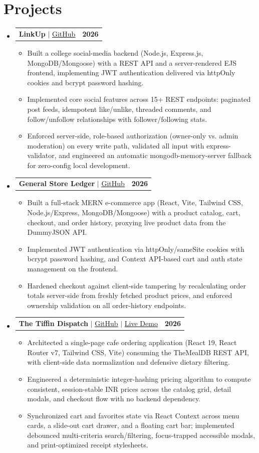 \documentclass[letterpaper,10pt]{article}
\makeatletter
\newcommand{\resumeItem}[1]{
  \item\small{
    {#1 \vspace{-2pt}}
  }
}
\newcommand{\resumeProjectHeading}[2]{
    \item
    \begin{tabular*}{1.001\textwidth}{l@{\extracolsep{\fill}}r}
      \small#1 & \textbf{\small #2}\\
    \end{tabular*}\vspace{-7pt}
}
\newcommand{\resumeSubHeadingListStart}{\begin{itemize}[leftmargin=0.0in, label={}]}
\newcommand{\resumeSubHeadingListEnd}{\end{itemize}}
\newcommand{\resumeItemListStart}{\begin{itemize}}
\newcommand{\resumeItemListEnd}{\end{itemize}\vspace{-5pt}}
\makeatother
\begin{document}
\section{Projects}
    \vspace{-5pt}
    \resumeSubHeadingListStart
\resumeProjectHeading
    {\textbf{LinkUp} $|$ \href{https://github.com/vaibhv19/LinkUp}{\underline{GitHub}}}{2026}
    \resumeItemListStart
        \resumeItem{Built a college social-media backend (Node.js, Express.js, MongoDB/Mongoose) with a REST API and a server-rendered EJS frontend, implementing JWT authentication delivered via httpOnly cookies and bcrypt password hashing.}
        \resumeItem{Implemented core social features across 15+ REST endpoints: paginated post feeds, idempotent like/unlike, threaded comments, and follow/unfollow relationships with follower/following stats.}
        \resumeItem{Enforced server-side, role-based authorization (owner-only vs. admin moderation) on every write path, validated all input with express-validator, and engineered an automatic mongodb-memory-server fallback for zero-config local development.}
    \resumeItemListEnd
          \vspace{-13pt}
\resumeProjectHeading
    {\textbf{General Store Ledger} $|$ \href{https://github.com/vaibhv19/general-store-ledger}{\underline{GitHub}}}{2026}
    \resumeItemListStart
        \resumeItem{Built a full-stack MERN e-commerce app (React, Vite, Tailwind CSS, Node.js/Express, MongoDB/Mongoose) with a product catalog, cart, checkout, and order history, proxying live product data from the DummyJSON API.}
        \resumeItem{Implemented JWT authentication via httpOnly/sameSite cookies with bcrypt password hashing, and Context API-based cart and auth state management on the frontend.}
        \resumeItem{Hardened checkout against client-side tampering by recalculating order totals server-side from freshly fetched product prices, and enforced ownership validation on all order-history endpoints.}
    \resumeItemListEnd
          \vspace{-13pt}
\resumeProjectHeading
    {\textbf{The Tiffin Dispatch} $|$ \href{https://github.com/vaibhv19/the-tiffin-dispatch}{\underline{GitHub}} $|$ \href{https://food-ordering-system-ruddy-sigma.vercel.app/}{\underline{Live Demo}}}{2026}
    \resumeItemListStart
        \resumeItem{Architected a single-page cafe ordering application (React 19, React Router v7, Tailwind CSS, Vite) consuming the TheMealDB REST API, with client-side data normalization and defensive dietary filtering.}
        \resumeItem{Engineered a deterministic integer-hashing pricing algorithm to compute consistent, session-stable INR prices across the catalog grid, detail modals, and checkout flow with no backend dependency.}
        \resumeItem{Synchronized cart and favorites state via React Context across menu cards, a slide-out cart drawer, and a floating cart bar; implemented debounced multi-criteria search/filtering, focus-trapped accessible modals, and print-optimized receipt stylesheets.}
    \resumeItemListEnd
    \resumeSubHeadingListEnd
\vspace{-12pt}
\end{document}
